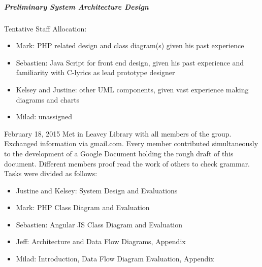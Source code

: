 \documentclass[]{article}
\begin{document}
\subparagraph{Preliminary System Architecture
Design}\label{preliminary-system-architecture-design}

Tentative Staff Allocation:

\begin{itemize}
\itemsep1pt\parskip0pt
\item
  Mark: PHP related design and class diagram(s) given his past
  experience
\item
  Sebastien: Java Script for front end design, given his past experience
  and familiarity with C-lyrics as lead prototype designer
\item
  Kelsey and Justine: other UML components, given vast experience making
  diagrams and charts
\item
  Milad: unassigned
\end{itemize}

February 18, 2015 Met in Leavey Library with all members of the group.
Exchanged information via gmail.com. Every member contributed
simultaneously to the development of a Google Document holding the rough
draft of this document. Different members proof read the work of others
to check grammar. Tasks were divided as follows:

\begin{itemize}
\itemsep1pt\parskip0pt
\item
  Justine and Kelsey: System Design and Evaluations
\item
  Mark: PHP Class Diagram and Evaluation
\item
  Sebastien: Angular JS Class Diagram and Evaluation
\item
  Jeff: Architecture and Data Flow Diagrams, Appendix
\item
  Milad: Introduction, Data Flow Diagram Evaluation, Appendix
\end{itemize}
\end{document}
